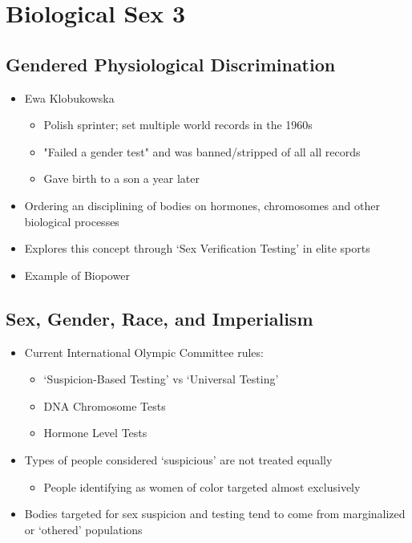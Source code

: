 \documentclass[a4paper]{article}
\begin{document}
\section{Biological Sex 3} %

\subsection{Gendered Physiological Discrimination}
\begin{itemize}
\item Ewa Klobukowska \begin{itemize}
\item Polish sprinter; set multiple world records in the 1960s
\item "Failed a gender test" and was banned/stripped of all all records
\item Gave birth to a son a year later
\end{itemize}
\item Ordering an disciplining of bodies on hormones, chromosomes and other biological processes
\item Explores this concept through `Sex Verification Testing' in elite sports
\item Example of Biopower
\end{itemize}

\subsection{Sex, Gender, Race, and Imperialism}
\begin{itemize}
\item Current International Olympic Committee rules: \begin{itemize}
\item `Suspicion-Based Testing' vs `Universal Testing'
\item DNA Chromosome Tests
\item Hormone Level Tests
\end{itemize}
\item Types of people considered `suspicious' are not treated equally \begin{itemize}
\item People identifying as women of color targeted almost exclusively
\end{itemize}
\item Bodies targeted for sex suspicion and testing tend to come from marginalized or `othered' populations
\end{itemize}
\end{document}
